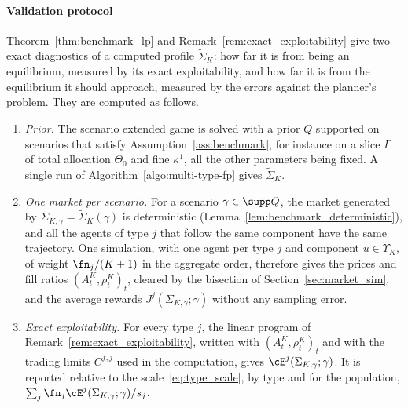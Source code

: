     \paragraph{Validation protocol} Theorem~\ref{thm:benchmark_lp} and Remark~\ref{rem:exact_exploitability} give two exact diagnostics of a computed profile $\tilde\Sigma_K$: how far it is from being an equilibrium, measured by its exact exploitability, and how far it is from the equilibrium it should approach, measured by the errors against the planner's problem. They are computed as follows.
    \begin{enumerate}
        \item \emph{Prior.} The scenario extended game is solved with a prior $Q$ supported on scenarios that satisfy Assumption~\ref{ass:benchmark}, for instance on a slice $\Gamma$ of total allocation $\Theta_0$ and fine $\kappa^1$, all the other parameters being fixed. A single run of Algorithm~\ref{algo:multi-type-fp} gives $\tilde\Sigma_K$.

        \item \emph{One market per scenario.} For a scenario $\gamma \in \supp Q$, the market generated by $\Sigma_{K,\gamma} = \tilde\Sigma_K(\gamma)$ is deterministic (Lemma~\ref{lem:benchmark_deterministic}), and all the agents of type $j$ that follow the same component have the same trajectory. One simulation, with one agent per type $j$ and component $u \in \Upsilon_K$, of weight $\fn_j / (K+1)$ in the aggregate order, therefore gives the prices and fill ratios $(A^K_t, \rho^K_t)_t$, cleared by the bisection of Section~\ref{sec:market_sim}, and the average rewards $J^j(\Sigma_{K,\gamma}; \gamma)$ without any sampling error.

        \item \emph{Exact exploitability.} For every type $j$, the linear program of Remark~\ref{rem:exact_exploitability}, written with $(A^K_t, \rho^K_t)_t$ and with the trading limits $C^{f,j}$ used in the computation, gives $\cE^j(\Sigma_{K,\gamma}; \gamma)$. It is reported relative to the scale~\eqref{eq:type_scale}, by type and for the population, $\sum_j \fn_j \cE^j(\Sigma_{K,\gamma}; \gamma) / s_j$.


\end{enumerate}
